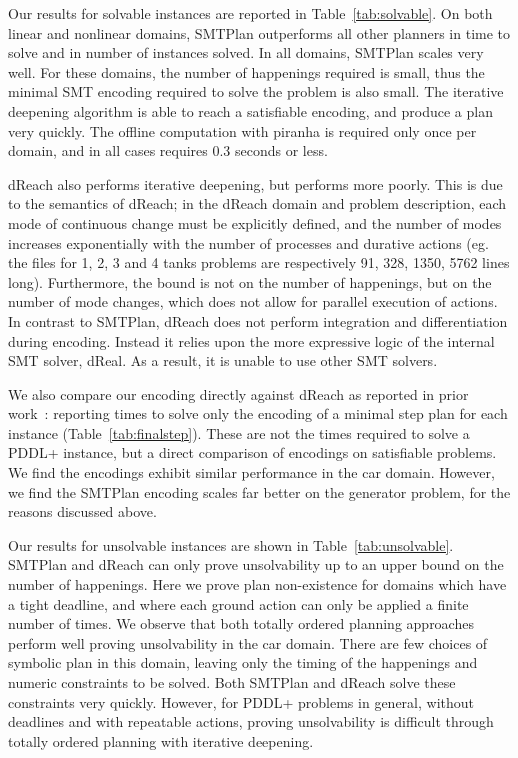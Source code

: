 Our results for solvable instances are reported in Table~\ref{tab:solvable}. On both linear and nonlinear domains, SMTPlan outperforms all other planners in time to solve and in number of instances solved. In all domains, SMTPlan scales very well. For these domains, the number of happenings required is small, thus the minimal SMT encoding required to solve the problem is also small. The iterative deepening algorithm is able to reach a satisfiable encoding, and produce a plan very quickly. The offline computation with {\sc piranha} is required only once per domain, and in all cases requires 0.3 seconds or less.

dReach also performs iterative deepening, but performs more poorly. This is due to the semantics of dReach; in the dReach domain and problem description, each mode of continuous change must be explicitly defined, and the number of modes increases exponentially with the number of processes and durative actions (eg. the files for 1, 2, 3 and 4 tanks problems are respectively 91, 328, 1350, 5762 lines long). Furthermore, the bound is not on the number of happenings, but on the number of mode changes, which does not allow for parallel execution of actions. In contrast to SMTPlan, dReach does not perform integration and differentiation during encoding. Instead it relies upon the more expressive logic of the internal SMT solver, dReal. As a result, it is unable to use other SMT solvers.

We also compare our encoding directly against dReach as reported in prior work~\cite{bryce}: reporting times to solve only the encoding of a minimal step plan for each instance (Table~\ref{tab:finalstep}). These are not the times required to solve a PDDL+ instance, but a direct comparison of encodings on satisfiable problems. We find the encodings exhibit similar performance in the car domain. However, we find the SMTPlan encoding scales far better on the generator problem, for the reasons discussed above.

Our results for unsolvable instances are shown in Table~\ref{tab:unsolvable}. SMTPlan and dReach can only prove unsolvability up to an upper bound on the number of happenings. Here we prove plan non-existence for domains which have a tight deadline, and where each ground action can only be applied a finite number of times. We observe that both totally ordered planning approaches perform well proving unsolvability in the car domain. There are few choices of symbolic plan in this domain, leaving only the timing of the happenings and numeric constraints to be solved. Both SMTPlan and dReach solve these constraints very quickly. However, for PDDL+ problems in general, without deadlines and with repeatable actions, proving unsolvability is difficult through totally ordered planning with iterative deepening.

